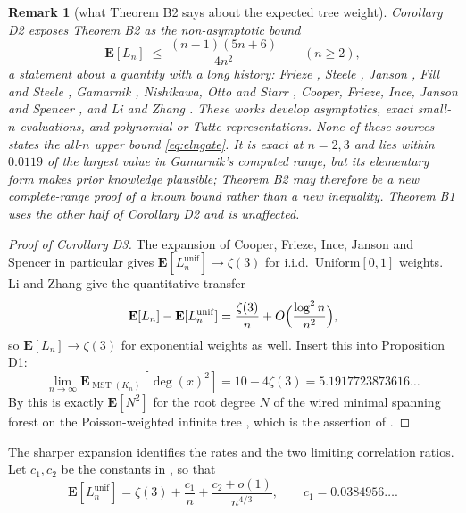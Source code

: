 \documentclass[10pt,a4paper]{amsart}
\newtheorem{remark}[theorem]{Remark}
\newcommand{\MST}{\operatorname{MST}}
\newcommand{\E}{\mathbf{E}}
\DeclareMathOperator{\dg}{deg}
\begin{document}
\begin{remark}[what Theorem B2 says about the expected tree weight]
\label{rem:eln}
Corollary D2 exposes Theorem B2 as the non-asymptotic bound
\begin{equation}
\label{eq:elngate}
\E[L_n]\;\le\;\frac{(n-1)(5n+6)}{4n^2}\qquad(n\ge2),
\end{equation}
a statement about a quantity with a long history: Frieze \cite{Frieze}, Steele
\cite{Steele}, Janson \cite{Janson}, Fill and Steele \cite{FillSteele}, Gamarnik
\cite{Gamarnik}, Nishikawa, Otto and Starr \cite{NOS}, Cooper, Frieze, Ince,
Janson and Spencer \cite{CFIJS}, and Li and Zhang \cite{LiZhang}. These works
develop asymptotics, exact small-$n$ evaluations, and polynomial or Tutte
representations. None of these sources states the all-$n$ upper bound
\eqref{eq:elngate}. It is exact at $n=2,3$ and lies within
$0.0119$ of the largest value in Gamarnik's computed range, but its elementary
form makes prior knowledge plausible; Theorem B2 may therefore be a new
complete-range proof of a known bound rather than a new inequality. Theorem B1
uses the other half of Corollary D2 and is unaffected.
\end{remark}

\begin{proof}[Proof of Corollary D3]
The expansion of Cooper, Frieze, Ince, Janson and Spencer \cite{CFIJS} in
particular gives $\E[L_n^{\mathrm{unif}}]\to\zeta(3)$ for i.i.d.\
$\mathrm{Uniform}[0,1]$ weights. Li and Zhang \cite{LiZhang} give the
quantitative transfer
\begin{equation}
\label{eq:lizhang}
\E[L_n]-\E[L_n^{\mathrm{unif}}]=\frac{\zeta(3)}n
+O\Bigl(\frac{\log^2n}{n^2}\Bigr),
\end{equation}
so $\E[L_n]\to\zeta(3)$ for exponential weights as well. Insert this into
Proposition D1:
\[
\lim_{n\to\infty}\E_{\MST(K_n)}[\dg(x)^2]=10-4\zeta(3)=5.1917723873616\ldots
\]
By \cite[Proposition 3.11]{TZ} this is exactly $\E[N^2]$ for the root degree $N$
of the wired minimal spanning forest on the Poisson-weighted infinite tree
\cite{NT}, which is the assertion of \cite[Question 3.8]{TZ}.
\end{proof}

The sharper expansion identifies the rates and the two limiting correlation
ratios. Let $c_1,c_2$ be the constants in \cite[Theorem 1]{CFIJS}, so that
\begin{equation}
\label{eq:uniform-expansion}
\E[L_n^{\mathrm{unif}}]
=\zeta(3)+\frac{c_1}{n}+\frac{c_2+o(1)}{n^{4/3}},
\qquad c_1=0.0384956\ldots .
\end{equation}
\end{document}
